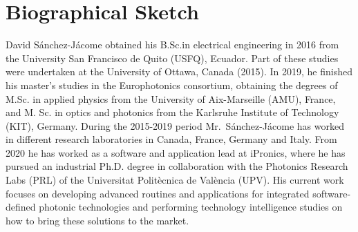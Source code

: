 

\chapter*{Biographical Sketch}

David Sánchez-Jácome obtained his B.Sc.in electrical engineering in 2016 from the University San Francisco de Quito (USFQ), Ecuador.
Part of these studies were undertaken at the University of Ottawa, Canada (2015).
In 2019, he finished his master’s studies in the Europhotonics consortium, obtaining the degrees of M.Sc.
in applied physics from the University of Aix-Marseille (AMU), France, and M.
Sc.
in optics and photonics from the Karlsruhe Institute of Technology (KIT), Germany.
During the 2015-2019 period Mr.~Sánchez-Jácome has worked in different research laboratories in Canada, France, Germany and Italy.
From 2020 he has worked as a software and application lead at iPronics, where he has pursued an industrial Ph.D.
degree in collaboration with the Photonics Research Labs (PRL) of the Universitat Politècnica de València (UPV).
His current work focuses on developing advanced routines and applications for integrated software-defined photonic technologies and performing technology intelligence studies on how to bring these solutions to the market.
